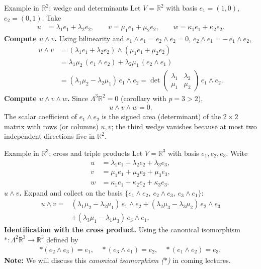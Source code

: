 \begin{frame}{Example in $\mathbb{R}^2$: wedge and determinants}
\vspace{-0.3cm}
Let $V=\mathbb{R}^2$ with basis $e_1=(1,0)$, $e_2=(0,1)$. Take
\begin{align*}
u&=\lambda_1 e_1+\lambda_2 e_2,\qquad
v=\mu_1 e_1+\mu_2 e_2,\qquad
w=\kappa_1 e_1+\kappa_2 e_2.
\end{align*}
\textbf{Compute $u\wedge v$.} Using bilinearity and $e_1\wedge e_1=e_2\wedge e_2=0$, $e_2\wedge e_1=-\,e_1\wedge e_2$,
\begin{align*}
u\wedge v
&=(\lambda_1 e_1+\lambda_2 e_2)\wedge(\mu_1 e_1+\mu_2 e_2)\\
&=\lambda_1\mu_2\, (e_1\wedge e_2)+\lambda_2\mu_1\, (e_2\wedge e_1)\\
&=(\lambda_1\mu_2-\lambda_2\mu_1)\, e_1\wedge e_2
= \det\!\begin{pmatrix}\lambda_1&\lambda_2\\ \mu_1&\mu_2\end{pmatrix}\, e_1\wedge e_2.
\end{align*}
\textbf{Compute $u\wedge v\wedge w$.} Since $\Lambda^3\mathbb{R}^2=0$ (corollary with $p=3>2$),
\begin{align*}
u\wedge v\wedge w = 0.
\end{align*}
The scalar coefficient of $e_1\wedge e_2$ is the signed area (determinant) of the $2\times 2$ matrix with rows (or columns) $u,v$; the third wedge vanishes because at most two independent directions live in $\mathbb{R}^2$.
\end{frame}

\begin{frame}{Example in $\mathbb{R}^3$: cross and triple products}
\vspace{-0.2cm}
Let $V=\mathbb{R}^3$ with basis $e_1,e_2,e_3$. Write
\begin{align*}
u&=\lambda_1 e_1+\lambda_2 e_2+\lambda_3 e_3,\\
v&=\mu_1 e_1+\mu_2 e_2+\mu_3 e_3,\\
w&=\kappa_1 e_1+\kappa_2 e_2+\kappa_3 e_3.
\end{align*}
\textbf{$u\wedge v$.} Expand and collect on the basis $\{e_1\wedge e_2,\ e_2\wedge e_3,\ e_3\wedge e_1\}$:
\begin{align*}
u\wedge v
=&(\lambda_1\mu_2-\lambda_2\mu_1)\, e_1\wedge e_2
+(\lambda_2\mu_3-\lambda_3\mu_2)\, e_2\wedge e_3\\
&
+(\lambda_3\mu_1-\lambda_1\mu_3)\, e_3\wedge e_1.
\end{align*}
\textbf{Identification with the cross product.} Using the canonical isomorphism $\ast:\Lambda^2\mathbb{R}^3\to\mathbb{R}^3$ defined by
\begin{align*}
\ast(e_2\wedge e_3)=e_1,\quad \ast(e_3\wedge e_1)=e_2,\quad \ast(e_1\wedge e_2)=e_3,
\end{align*}
\textbf{Note:} We will discuss this \textit{canonical isomorphism ($\ast$)} in coming lectures.
\end{frame}


